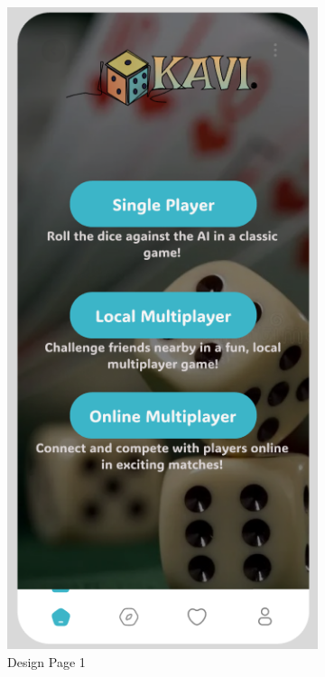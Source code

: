 \begin{figure}[h]
    \centering
    \begin{subfigure}[b]{0.48\textwidth}
        \centering
        \includegraphics[scale=0.45]{img/play.png}
        \caption{Design Page 1}
        \label{fig:figma_design1}
    \end{subfigure}
    \hspace{0.02\textwidth}
    \begin{subfigure}[b]{0.48\textwidth}
        \centering

\end{subfigure}
\end{figure}
